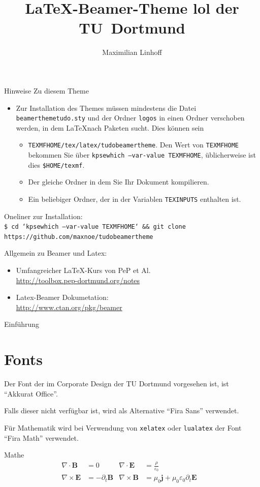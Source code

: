 \documentclass[aspectratio=1610, 9pt]{beamer}
\title{\LaTeX-Beamer-Theme lol der TU~Dortmund}
\author[M.~Linhoff]{Maximilian Linhoff}
\institute[Kurzform Lehrstuhl]{Names des Lehrstuhls \\  Name der Fakultät}
\begin{document}
\maketitle

\begin{frame}{Hinweise}
  Zu diesem Theme
  \begin{itemize}
    \item Zur Installation des Themes müssen mindestens die Datei \texttt{beamerthemetudo.sty} und der Ordner \texttt{logos} in einen Ordner verschoben werden, in dem \LaTeX nach Paketen sucht.
      Dies können sein
      \begin{itemize}
        \item \texttt{TEXMFHOME/tex/latex/tudobeamertheme}. Den Wert von \texttt{TEXMFHOME} bekommen Sie über \texttt{kpsewhich --var-value TEXMFHOME}, üblicherweise ist dies \texttt{\$HOME/texmf}.
        \item Der gleiche Ordner in dem Sie Ihr Dokument kompilieren.
        \item Ein beliebiger Ordner, der in der Variablen \texttt{TEXINPUTS} enthalten ist.
      \end{itemize}
  \end{itemize}

  Oneliner zur Installation:\\
  \texttt{\footnotesize\$ cd `kpsewhich --var-value TEXMFHOME` \&\& git clone https://github.com/maxnoe/tudobeamertheme}

  \medskip
  Allgemein zu Beamer und Latex:
  \begin{itemize}
    \item Umfangreicher \LaTeX-Kurs von PeP et Al. \\
      \url{http://toolbox.pep-dortmund.org/notes}
    \item Latex-Beamer Dokumetation:\\
    \url{http://www.ctan.org/pkg/beamer}
  \end{itemize}
\end{frame}

\begin{frame}{Einführung}
  \tableofcontents
\end{frame}

\section{Fonts}
\begin{frame}
  Der Font der im Corporate Design der TU Dortmund vorgesehen ist,
  ist \enquote{Akkurat Office}.

  Falls dieser nicht verfügbar ist, wird als Alternative \enquote{Fira Sans}
  verwendet.

  Für Mathematik wird bei Verwendung von \texttt{xelatex} oder \texttt{lualatex} der Font \enquote{Fira Math} verwendet.
\end{frame}

\begin{frame}{Mathe}
  \begin{align*}
    \nabla \cdot \symbf{B} &= 0 &
    \nabla \cdot \symbf{E} &= \frac{ρ}{ε_0} \\
    \nabla \times \symbf{E} &= -\partial_t \symbf{B} &
    \nabla \times \symbf{B} &= μ_0 \symbf{j} + μ_0 ε_0 \partial_t \symbf{E} &
  \end{align*}
\end{frame}
\end{document}
